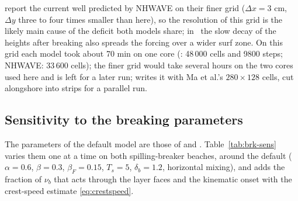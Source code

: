 \citet{ma2012} report the current well predicted by NHWAVE on their finer grid
($\Delta x = 3$ cm, $\Delta y$ three to four times smaller than here), so the
resolution of this grid is the likely main cause of the deficit both models
share; in \NHFOAM\ the slow decay of the heights after breaking also spreads
the forcing over a wider surf zone. On this grid each model took about 70 min
on one core (\NHFOAM: 48\,000 cells and 9800 steps; NHWAVE: 33\,600 cells);
the finer grid would take several hours on the two cores used here and is
left for a later run;  writes it with Ma et al.'s $280\times128$ cells, cut alongshore
into strips for a parallel run.

\subsection{Sensitivity to the breaking parameters}
\label{sec:brk-sens}

The parameters of the default model are those of \citet{smit2013} and
\citet{kennedy2000}. Table~\ref{tab:brk-sens} varies them one at a time on
both spilling-breaker beaches, around the default ($\alpha = 0.6$,
$\beta = 0.3$, $\beta_F = 0.15$, $T_s = 5$, $\delta_b = 1.2$, horizontal
mixing), and adds the fraction of $\nu_b$ that acts through the layer
faces and the kinematic onset with the crest-speed estimate
\eqref{eq:crestspeed}.

